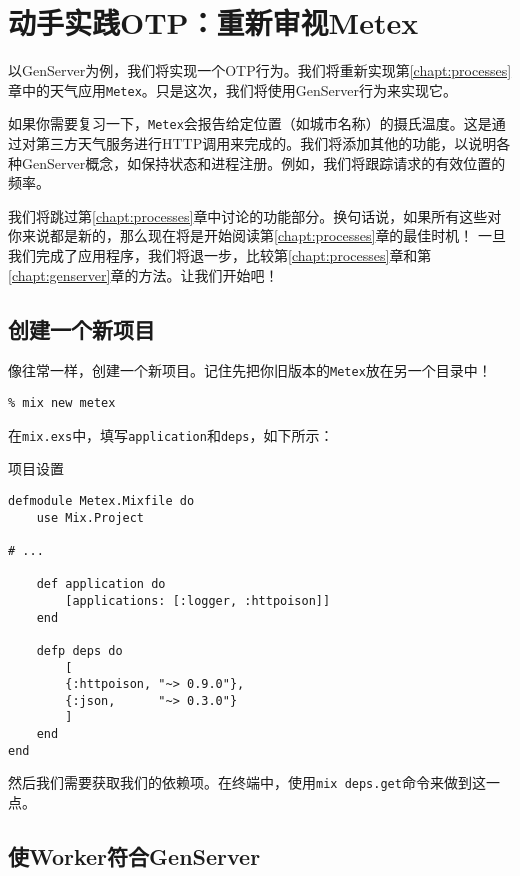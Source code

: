 \section{动手实践OTP：重新审视Metex}

以GenServer为例，我们将实现一个OTP行为。我们将重新实现第\ref{chapt:processes}章中的天气应用\texttt{Metex}。只是这次，我们将使用GenServer行为来实现它。

如果你需要复习一下，\texttt{Metex}会报告给定位置（如城市名称）的摄氏温度。这是通过对第三方天气服务进行HTTP调用来完成的。我们将添加其他的功能，以说明各种GenServer概念，如保持状态和进程注册。例如，我们将跟踪请求的有效位置的频率。

我们将跳过第\ref{chapt:processes}章中讨论的功能部分。换句话说，如果所有这些对你来说都是新的，那么现在将是开始阅读第\ref{chapt:processes}章的最佳时机！
一旦我们完成了应用程序，我们将退一步，比较第\ref{chapt:processes}章和第\ref{chapt:genserver}章的方法。让我们开始吧！

\subsection{创建一个新项目}

像往常一样，创建一个新项目。记住先把你旧版本的\texttt{Metex}放在另一个目录中！

\begin{code}{}
\begin{verbatim}
% mix new metex
\end{verbatim}
\end{code}

在\texttt{mix.exs}中，填写\texttt{application}和\texttt{deps}，如下所示：

\begin{code}{项目设置}
\begin{verbatim}
defmodule Metex.Mixfile do
    use Mix.Project

# ...

    def application do
        [applications: [:logger, :httpoison]]
    end

    defp deps do
        [
        {:httpoison, "~> 0.9.0"},
        {:json,      "~> 0.3.0"}
        ]
    end
end
\end{verbatim}
\label{lst:project_setting_genserver}
\end{code}

然后我们需要获取我们的依赖项。在终端中，使用\texttt{mix deps.get}命令来做到这一点。

\subsection{使Worker符合GenServer}

